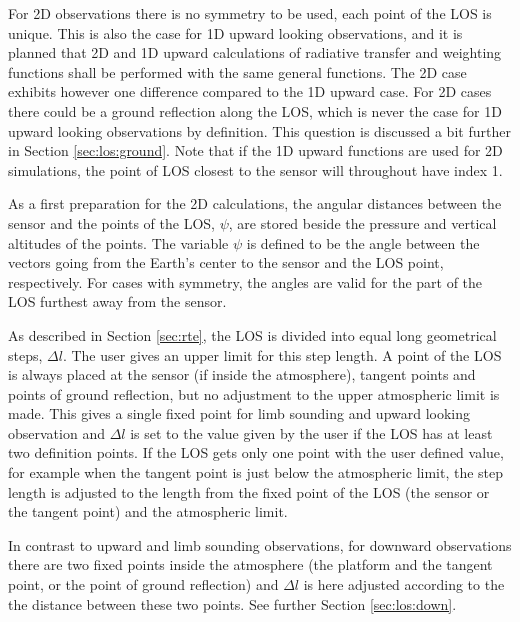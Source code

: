  For 2D observations there is no symmetry to be used, each point of
 the LOS is unique. This is also the case for 1D upward looking
 observations, and it is planned that 2D and 1D upward calculations of
 radiative transfer and weighting functions shall be performed with
 the same general functions.  The 2D case exhibits however one
 difference compared to the 1D upward case. For 2D cases there could
 be a ground reflection along the LOS, which is never the case for 1D
 upward looking observations by definition. This question is discussed
 a bit further in Section \ref{sec:los:ground}. Note that if the 1D
 upward functions are used for 2D simulations, the point of LOS
 closest to the sensor will throughout have index 1.

 As a first preparation for the 2D calculations, the angular distances
 between the sensor and the points of the LOS, $\psi$, are stored
 beside the pressure and vertical altitudes of the points. The
 variable $\psi$ is defined to be the angle between the vectors going
 from the Earth's center to the sensor and the LOS point,
 respectively.  For cases with symmetry, the angles are valid for the
 part of the LOS furthest away from the sensor.
 


 \label{sec:rte:stepl}
 
 As described in Section \ref{sec:rte}, the LOS is divided into equal
 long geometrical steps, $\Delta l$. The user gives an upper limit for
 this step length. A point of the LOS is always placed at the sensor
 (if inside the atmosphere), tangent points and points of ground
 reflection, but no adjustment to the upper atmospheric limit is made.
 This gives a single fixed point for limb sounding and upward looking
 observation and $\Delta l$ is set to the value given by the user if
 the LOS has at least two definition points. If the LOS gets only one
 point with the user defined value, for example when the tangent point
 is just below the atmospheric limit, the step length is adjusted to
 the length from the fixed point of the LOS (the sensor or the tangent 
 point) and the atmospheric limit.
 
 In contrast to upward and limb sounding observations, for downward
 observations there are two fixed points inside the atmosphere (the
 platform and the tangent point, or the point of ground reflection)
 and $\Delta l$ is here adjusted according to the the distance between
 these two points. See further Section \ref{sec:los:down}.



